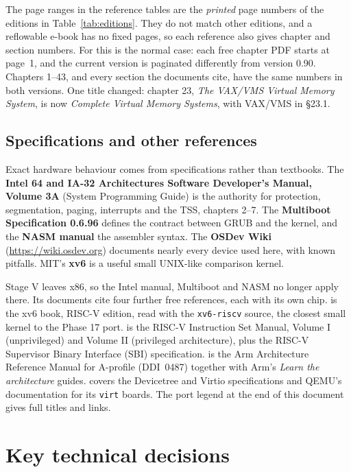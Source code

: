 \documentclass[11pt,a4paper]{article}
\begin{document}
\begin{warnbox}
The page ranges in the reference tables are the \emph{printed} page numbers of the editions in
Table~\ref{tab:editions}. They do not match other editions, and a reflowable e-book has no fixed pages, so each
reference also gives chapter and section numbers. For \OSTEP this is the normal case: each free chapter PDF starts at
page~1, and the current version is paginated differently from version 0.90. Chapters 1--43, and every section the
documents cite, have the same numbers in both versions. One title changed: chapter 23, \emph{The VAX/VMS Virtual
Memory System}, is now \emph{Complete Virtual Memory Systems}, with VAX/VMS in \S23.1.
\end{warnbox}

\subsection{Specifications and other references}

Exact hardware behaviour comes from specifications rather than textbooks. The \textbf{Intel 64 and IA-32
Architectures Software Developer's Manual, Volume 3A} (System Programming Guide) is the authority for protection,
segmentation, paging, interrupts and the TSS, chapters 2--7. The \textbf{Multiboot Specification 0.6.96} defines the
contract between GRUB and the kernel, and the \textbf{NASM manual} the assembler syntax. The \textbf{OSDev Wiki}
(\url{https://wiki.osdev.org}) documents nearly every device used here, with known pitfalls. MIT's \textbf{xv6} is a
useful small UNIX-like comparison kernel.

Stage V leaves x86, so the Intel manual, Multiboot and NASM no longer apply there. Its documents cite four further
free references, each with its own chip. \XVSIX is the xv6 book, RISC-V edition, read with the \texttt{xv6-riscv}
source, the closest small kernel to the Phase 17 port. \RVSPEC is the RISC-V Instruction Set Manual, Volume I
(unprivileged) and Volume II (privileged architecture), plus the RISC-V Supervisor Binary Interface (SBI)
specification. \ARMDOC is the Arm Architecture Reference Manual for A-profile (DDI~0487) together with Arm's
\emph{Learn the architecture} guides. \SPEC covers the Devicetree and Virtio specifications and QEMU's documentation
for its \texttt{virt} boards. The port legend at the end of this document gives full titles and links.

\section{Key technical decisions}\label{sec:decisions}
\end{document}
